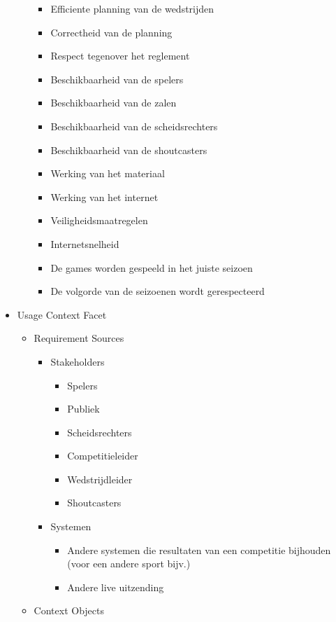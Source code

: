 \documentclass[12pt,a4paper]{article}
\begin{document}
\begin{itemize}
\begin{itemize}
				\begin{itemize}
					\item Efficiente planning van de wedstrijden
					\item Correctheid van de planning
					\item Respect tegenover het reglement
					\item Beschikbaarheid van de spelers
					\item Beschikbaarheid van de zalen
					\item Beschikbaarheid van de scheidsrechters
					\item Beschikbaarheid van de shoutcasters
					\item Werking van het materiaal
					\item Werking van het internet
					\item Veiligheidsmaatregelen
					\item Internetsnelheid
					\item De games worden gespeeld in het juiste seizoen
					\item De volgorde van de seizoenen wordt gerespecteerd
				\end{itemize}
			\end{itemize}
			\item Usage Context Facet
			\begin{itemize}
				\item Requirement Sources
				\begin{itemize}
					\item Stakeholders
					\begin{itemize}
						\item Spelers
						\item Publiek
						\item Scheidsrechters
						\item Competitieleider
						\item Wedstrijdleider
						\item Shoutcasters
					\end{itemize}
					\item Systemen
					\begin{itemize}
						\item Andere systemen die resultaten van een competitie bijhouden (voor een andere sport bijv.)
						\item Andere live uitzending
					\end{itemize}
				\end{itemize}
				\item Context Objects

\end{itemize}
\end{itemize}
\end{document}
